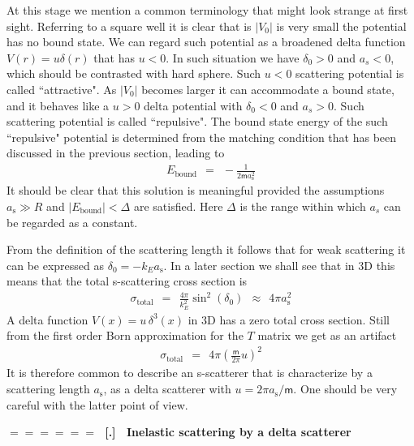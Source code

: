 \documentclass[onecolumn,fleqn]{revtex4}
\newcommand{\mass}{\mathsf{m}}
\newcommand{\tbox}[1]{\text{#1}}
\newcommand{\beq}{\begin{eqnarray}}
\newcommand{\eeq}{\end{eqnarray}}
\renewcommand{\thesubsection}{\arabic{subsection}}
\renewcommand{\thesubsubsection}{\arabic{subsubsection}}
\newcommand{\sheadC}[1]
{
\addtocounter{subsubsection}{1}
\vspace{5mm}
{\Large\bf $=\!=\!=\!=\!=\!=\;$ [\thesubsection.\thesubsubsection] \ #1}  
\nopagebreak
\phantomsection
}
\begin{document}
 
At this stage we mention a common terminology that might 
look strange at first sight. Referring to a square well 
it is clear that is $|V_0|$ is very small the potential 
has no bound state. We can regard such potential as a broadened 
delta function $V(r) = u \delta(r)$ that has ${u<0}$. 
In such situation we have ${\delta_0>0}$ and $a_s<0$, 
which should be contrasted with hard sphere. 
Such ${u<0}$ scattering potential is called ``attractive".
As $|V_0|$ becomes larger it can accommodate 
a bound state, and it behaves like a ${u>0}$
delta potential with ${\delta_0<0}$ and $a_s>0$. 
Such scattering potential is called ``repulsive".
The bound state energy of the such ``repulsive"  
potential is determined from the matching condition
that has been discussed in the previous section, leading to  
\beq
E_{\tbox{bound}} \ \ = \ \ -\frac{1}{2\mass a_{\tbox{s}}^2}
\eeq
It should be clear that this solution is 
meaningful provided the assumptions ${a_{\tbox{s}} \gg R}$ 
and $|E_{\tbox{bound}}|<\Delta$ are satisfied.
Here $\Delta$ is the range within which $a_s$ 
can be regarded as a constant.
 
From the definition of the scattering length 
it follows that for weak scattering it can be 
expressed as ${\delta_0=-k_Ea_{\tbox{s}}}$.
In a later section we shall see that in 3D 
this means that the total s-scattering cross section is 
\beq
\sigma_{\tbox{total}} 
\ \ = \ \ \frac{4\pi}{k_E^2}\sin^2(\delta_0)  
\ \ \approx \ \  4\pi a_{\tbox{s}}^2 
\eeq
A delta function $V(x) = u\,\delta^3(x)$ in 3D has a zero total 
cross section. Still from the first order Born approximation 
for the $T$ matrix we get as an artifact 
\beq
\sigma_{\tbox{total}} \ \ = \ \ 4\pi\left(\frac{\mass}{2\pi}u\right)^2 
\eeq
It is therefore common to describe an s-scatterer 
that is characterize by a scattering length $a_{\tbox{s}}$, 
as a delta scatterer with ${u=2\pi a_{\tbox{s}}/\mass}$.   
One should be very careful with the latter point of view.


\sheadC{Inelastic scattering by a delta scatterer}
\end{document}

